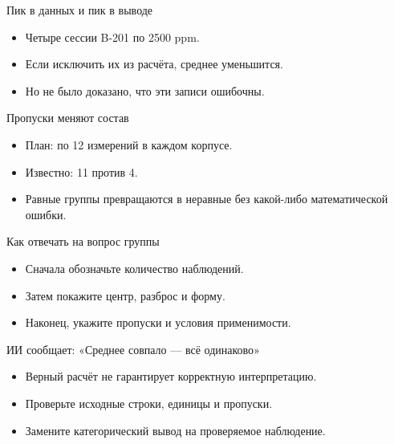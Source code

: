\documentclass[aspectratio=169,10pt]{beamer}
\begin{document}
\begin{frame}[t]{Пик в данных и пик в выводе}
\vspace{.15cm}\begin{itemize}
\item Четыре сессии B-201 по 2500 ppm.\vspace{6pt}
\item Если исключить их из расчёта, среднее уменьшится.\vspace{6pt}
\item Но не было доказано, что эти записи ошибочны.\vspace{6pt}
\end{itemize}
\end{frame}
\begin{frame}[t]{Пропуски меняют состав}
\vspace{.15cm}\begin{itemize}
\item План: по 12 измерений в каждом корпусе.\vspace{6pt}
\item Известно: 11 против 4.\vspace{6pt}
\item Равные группы превращаются в неравные без какой-либо математической ошибки.\vspace{6pt}
\end{itemize}
\end{frame}
\begin{frame}[t]{Как отвечать на вопрос группы}
\vspace{.15cm}\begin{itemize}
\item Сначала обозначьте количество наблюдений.\vspace{6pt}
\item Затем покажите центр, разброс и форму.\vspace{6pt}
\item Наконец, укажите пропуски и условия применимости.\vspace{6pt}
\end{itemize}
\end{frame}
\begin{frame}[t]{ИИ сообщает: «Среднее совпало — всё одинаково»}
\vspace{.15cm}\begin{itemize}
\item Верный расчёт не гарантирует корректную интерпретацию.\vspace{6pt}
\item Проверьте исходные строки, единицы и пропуски.\vspace{6pt}
\item Замените категорический вывод на проверяемое наблюдение.\vspace{6pt}
\end{itemize}
\end{frame}
\end{document}
